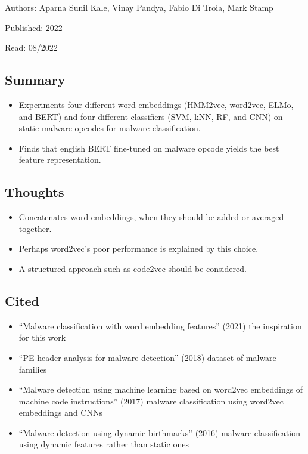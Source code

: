 \documentclass{article}
\begin{document}
\noindent Authors: Aparna Sunil Kale, Vinay Pandya, Fabio Di Troia, Mark Stamp

\noindent Published: 2022

\noindent Read: 08/2022

\subsection*{Summary}
\begin{itemize}
\item Experiments four different word embeddings (HMM2vec, word2vec, ELMo, and BERT) and four different classifiers (SVM, kNN, RF, and CNN) on static malware opcodes for malware classification.
\item Finds that english BERT fine-tuned on malware opcode yields the best feature representation.
\end{itemize}

\subsection*{Thoughts}
\begin{itemize}
\item Concatenates word embeddings, when they should be added or averaged together.
\item Perhaps word2vec's poor performance is explained by this choice.
\item A structured approach such as code2vec should be considered.
\end{itemize}

\subsection*{Cited}
\begin{itemize}
\item ``Malware classification with word embedding features'' (2021) the inspiration for this work
\item ``PE header analysis for malware detection'' (2018) dataset of malware families
\item ``Malware detection using machine learning based on word2vec embeddings of machine code instructions'' (2017) malware classification using word2vec embeddings and CNNs
\item ``Malware detection using dynamic birthmarks'' (2016) malware classification using dynamic features rather than static ones
\end{itemize}
\end{document}

